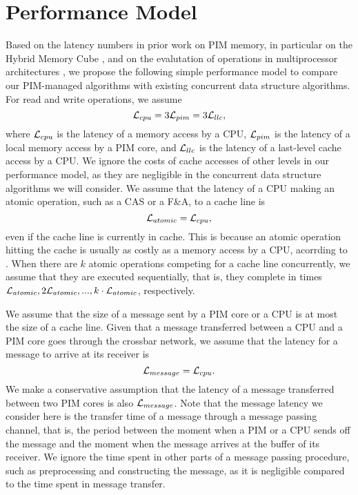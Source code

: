 \section{Performance Model}
\label{section:performance_model}
Based on the latency numbers in prior work on PIM memory, 
in particular on the Hybrid Memory Cube \cite{website:HMC, Azarkhish16}, 
and on the evalutation of operations in multiprocessor architectures \cite{David13},
we propose the following simple performance model to compare 
our PIM-managed algorithms with existing concurrent data structure algorithms.
For read and write operations, we assume 
$$\mathcal{L}_{cpu} = 3\mathcal{L}_{pim} = 3\mathcal{L}_{llc},$$
where $\mathcal{L}_{cpu}$ is the latency of a memory access by a CPU,
$\mathcal{L}_{pim}$ is the latency of a local memory access by a PIM core, and
$\mathcal{L}_{llc}$ is the latency of a last-level cache access by a CPU.
We ignore the costs of cache accesses of other levels in our performance model,
as they are negligible in the concurrent data structure algorithms we will consider.
We assume that the latency of a CPU making an atomic operation, such as a CAS or a F\&A,
to a cache line is 
$$\mathcal{L}_{atomic} = \mathcal{L}_{cpu},$$ 
even if the cache line is currently in cache.
This is because an atomic operation hitting the cache is usually 
as costly as a memory access by a CPU, acorrding to \cite{David13}.
When there are $k$ atomic operations competing for a cache line concurrently,
we assume that they are executed sequentially, that is,
they complete in times $\mathcal{L}_{atomic}, 2\mathcal{L}_{atomic},..., k\cdot\mathcal{L}_{atomic}$, respectively.

We assume that the size of a message sent by a PIM core or a CPU is at most 
the size of a cache line.
Given that a message transferred between a CPU and a PIM core goes through
the crossbar network, we assume that the latency for a message to arrive at its receiver is 
$$\mathcal{L}_{message} = \mathcal{L}_{cpu}.$$
We make a conservative assumption that the latency of a message transferred 
between two PIM cores is also $\mathcal{L}_{message}$.
Note that the message latency we consider here is the transfer time of a message
through a message passing channel, that is, the period between the moment
when a PIM or a CPU sends off the message and the moment when
the message arrives at the buffer of its receiver.
We ignore the time spent in other parts of a message passing procedure,
such as preprocessing and constructing the message,
as it is negligible compared to the time spent in message transfer.

